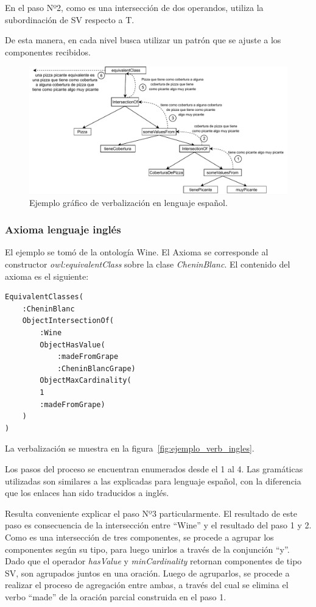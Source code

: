 En el paso Nº2, como es una intersección de dos operandos, utiliza la subordinación de SV respecto a T.

De esta manera, en cada nivel busca utilizar un patrón que se ajuste a los componentes recibidos.

\begin{figure}
    \centering
    \includegraphics[width=\textwidth]{img/generacion_documento/verbalizacion_equivalentClass_spanish.pdf}
    \caption{Ejemplo gráfico de verbalización en lenguaje español.}
    \label{fig:ejemplo_verb_espaniol}
\end{figure}

\subsubsection{Axioma lenguaje inglés}
El ejemplo se tomó de la ontología Wine. El Axioma se corresponde al constructor \emph{owl:equivalentClass} sobre la clase \emph{CheninBlanc}. El contenido del axioma es el siguiente: 

\begin{verbatim}
EquivalentClasses(
    :CheninBlanc
    ObjectIntersectionOf(
        :Wine
        ObjectHasValue(
            :madeFromGrape
            :CheninBlancGrape)
        ObjectMaxCardinality(
        1
        :madeFromGrape)
    )
)
\end{verbatim}
La verbalización se muestra en la figura~\ref{fig:ejemplo_verb_ingles}.

Los pasos del proceso se encuentran enumerados desde el 1 al 4. Las gramáticas utilizadas son similares a las explicadas para lenguaje español, con la diferencia que los enlaces han sido traducidos a inglés.

Resulta conveniente explicar el paso Nº3 particularmente. El resultado de este paso es consecuencia de la intersección entre ``Wine'' y el resultado del paso 1 y 2. 
Como es una intersección de tres componentes, se procede a agrupar los componentes según su tipo, para luego unirlos a través de la conjunción ``y''. Dado que el operador \emph{hasValue} y \emph{minCardinality} retornan componentes de tipo SV, son agrupados juntos en una oración. Luego de agruparlos, se procede a realizar el proceso de agregación entre ambas, a través del cual se elimina el verbo ``made'' de la oración parcial construida en el paso 1. 

